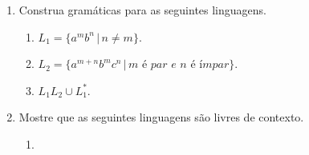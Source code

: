 \documentclass[a4paper]{article}
\theoremstyle{definition}
\begin{document}
  \begin{enumerate}
     \item Construa gramáticas para as seguintes linguagens.
       \begin{enumerate}
          \item $L_1 = \{a^mb^n\,|\, n \neq m\}$.
          \item $L_2 = \{a^{m + n}b^mc^n\,|\, m\textit{ é par e }n\textit{ é
              ímpar}\}$.
          \item $L_1L_2 \cup L_1^*$.
       \end{enumerate}
     \item Mostre que as seguintes linguagens são livres de contexto.
       \begin{enumerate}
         \item
       \end{enumerate}
  \end{enumerate}
\end{document}
